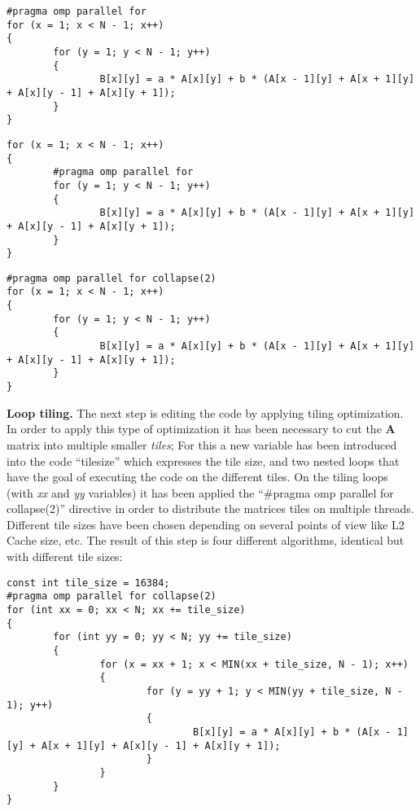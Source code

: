 \documentclass[conference]{IEEEtran}
\newcommand{\mypar}[1]{{\bf #1.}}
\begin{document}
\setcounter{lstlisting}{2}
\renewcommand{\lstlistingname}{Algorithm}

\begin{lstlisting}[caption={Parallel loop on X},label={lst:parallel-loop-x}]
#pragma omp parallel for
for (x = 1; x < N - 1; x++)
{
		for (y = 1; y < N - 1; y++)
		{
				B[x][y] = a * A[x][y] + b * (A[x - 1][y] + A[x + 1][y] + A[x][y - 1] + A[x][y + 1]);
		}
}
\end{lstlisting}

\begin{lstlisting}[caption={Parallel loop on Y},label={lst:parallel-loop-y}]
for (x = 1; x < N - 1; x++)
{
		#pragma omp parallel for
		for (y = 1; y < N - 1; y++)
		{
				B[x][y] = a * A[x][y] + b * (A[x - 1][y] + A[x + 1][y] + A[x][y - 1] + A[x][y + 1]);
		}
}
\end{lstlisting}

\begin{lstlisting}[caption={Parallel loop on X and Y},label={lst:parallel-loop-x-y}]
#pragma omp parallel for collapse(2)
for (x = 1; x < N - 1; x++)
{
		for (y = 1; y < N - 1; y++)
		{
				B[x][y] = a * A[x][y] + b * (A[x - 1][y] + A[x + 1][y] + A[x][y - 1] + A[x][y + 1]);
		}
}
\end{lstlisting}

\mypar{Loop tiling}
The next step is editing the code by applying tiling optimization. In order to apply this type of optimization it has been necessary to cut the \textbf{A} matrix into multiple smaller \textit{tiles}; For this a new variable has been introduced into the code ``tile\textunderscore size'' which expresses the tile size, and two nested loops that have the goal of executing the code on the different tiles. On the tiling loops (with \textit{xx} and \textit{yy} variables) it has been applied the ``#pragma omp parallel for collapse(2)'' directive in order to distribute the matrices tiles on multiple threads. Different tile sizes have been chosen depending on several points of view like L2 Cache size, etc. The result of this step is four different algorithms, identical but with different tile sizes:

\renewcommand{\lstlistingname}{Algorithm}

\begin{lstlisting}[caption={Loop tiling with size of 16384},label={lst:tiling-1}]
const int tile_size = 16384;
#pragma omp parallel for collapse(2)
for (int xx = 0; xx < N; xx += tile_size)
{
		for (int yy = 0; yy < N; yy += tile_size)
		{
				for (x = xx + 1; x < MIN(xx + tile_size, N - 1); x++)
				{
						for (y = yy + 1; y < MIN(yy + tile_size, N - 1); y++)
						{
								B[x][y] = a * A[x][y] + b * (A[x - 1][y] + A[x + 1][y] + A[x][y - 1] + A[x][y + 1]);
						}
				}
		}
}
\end{lstlisting}
\end{document}
